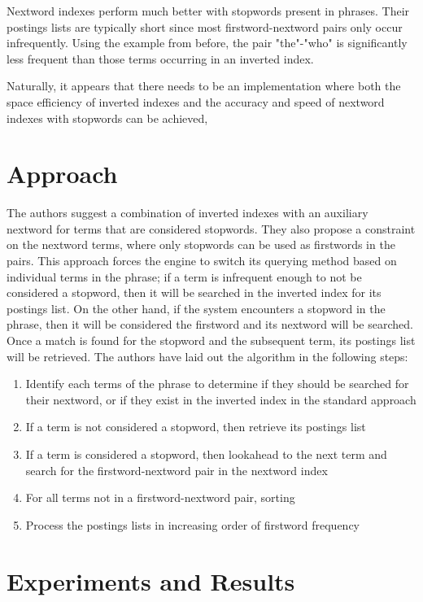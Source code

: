 \documentclass[11pt]{article}
\begin{document}
    Nextword indexes perform much better with stopwords present in phrases. Their postings lists are typically short since most firstword-nextword pairs only occur infrequently. Using the example from before, the pair "the"-"who" is significantly less frequent than those terms occurring in an inverted index.

    Naturally, it appears that there needs to be an implementation where both the space efficiency of inverted indexes and the accuracy and speed of nextword indexes with stopwords can be achieved,

    \section*{Approach}

    The authors suggest a combination of inverted indexes with an auxiliary nextword for terms that are considered stopwords. They also propose a constraint on the nextword terms, where only stopwords can be used as firstwords in the pairs. This approach forces the engine to switch its querying method based on individual terms in the phrase; if a term is infrequent enough to not be considered a stopword, then it will be searched in the inverted index for its postings list. On the other hand, if the system encounters a stopword in the phrase, then it will be considered the firstword and its nextword will be searched. Once a match is found for the stopword and the subsequent term, its postings list will be retrieved. The authors have laid out the algorithm in the following steps:

    \begin{enumerate}
        \item Identify each terms of the phrase to determine if they should be searched for their nextword, or if they exist in the inverted index in the standard approach
        \item If a term is not considered a stopword, then retrieve its postings list
        \item If a term is considered a stopword, then lookahead to the next term and search for the firstword-nextword pair in the nextword index
        \item For all terms not in a firstword-nextword pair, sorting
        \item Process the postings lists in increasing order of firstword frequency
    \end{enumerate}

    \section*{Experiments and Results}
\end{document}
